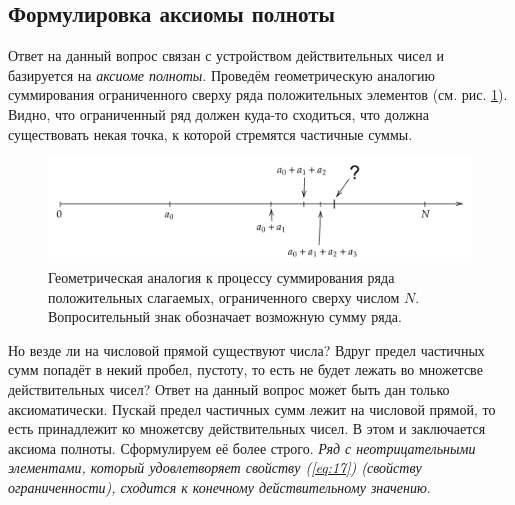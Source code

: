 \documentclass[12pt]{article}
\begin{document}
\subsection{Формулировка аксиомы полноты}
Ответ на данный вопрос связан с устройством действительных чисел и базируется на \emph{аксиоме полноты}. Проведём геометрическую аналогию суммирования ограниченного сверху ряда положительных элементов (см. рис. \ref{fig:3}). Видно, что ограниченный ряд должен куда\--то сходиться, что должна существовать некая точка, к которой стремятся частичные суммы.
\begin{figure}[ht]
    \centering
    \includegraphics[width = 1\textwidth]{Лекция 2/fig3.png}
    \caption{Геометрическая аналогия к процессу суммирования ряда положительных слагаемых, ограниченного сверху числом $N$. Вопросительный знак обозначает возможную сумму ряда.}
    \label{fig:3}
\end{figure}
Но везде ли на числовой прямой существуют числа? Вдруг предел частичных сумм попадёт в некий пробел, пустоту, то есть не будет лежать во множетсве действительных чисел? Ответ на данный вопрос может быть дан только аксиоматически. Пускай предел частичных сумм лежит на числовой прямой, то есть принадлежит ко множетсву действительных чисел. В этом и заключается аксиома полноты. Сформулируем её более строго. \emph{Ряд с неотрицательными элементами, который удовлетворяет свойству (\ref{eq:17}) (свойству ограниченности), сходится к конечному действительному значению}.
\end{document}
